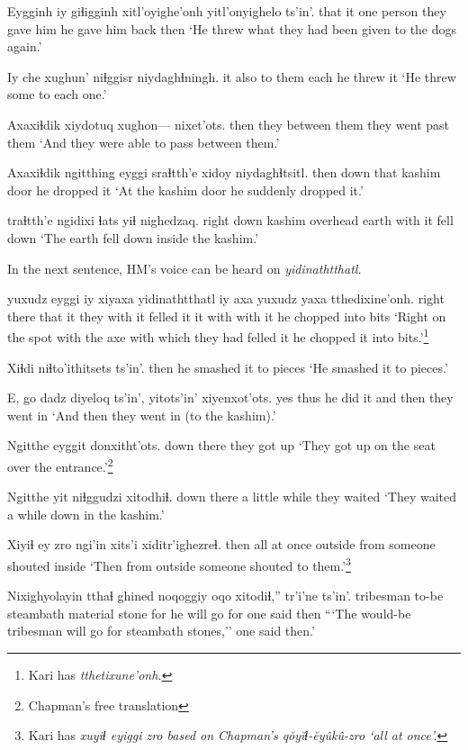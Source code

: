 \documentclass[12pt]{article}
\begin{document}
\gll Eygginh iy giɬigginh xitl'oyighe'onh yitl'onyighelo  ts'in'.
that it {one person} {they gave him} {he gave him back} then
\glt `He threw what they had been given to the dogs again.'
\glend

\gll Iy che xughun' niɬggisr niydaghɬningh.
it also {to them} each {he threw it}
\glt `He threw some to each one.'
\glend

\gll Axaxiɬdik xiydotuq  {xughon--- nixet'ots.}
then  {they between them} {they went past them}
\glt `And they were able to pass between them.'
\glend

\gll Axaxiɬdik ngitthing eyggi sraɬtth'e xidoy niydaghɬtsitl.
then  down  that  kashim  door  {he dropped it}
\glt `At the kashim door he suddenly dropped it.'
\glend

 traɬtth'e ngidixi ɬats yiɬ nighedzaq.
{right  down}  kashim  overhead earth with {it fell down}
\glt `The earth fell down inside the kashim.'
\glend

In the next sentence, HM's voice can be heard on \em yidinathtthatl. \em

 yuxudz eyggi  iy xiyaxa yidinathtthatl iy axa yuxudz yaxa  tthedixine'onh.
{right there} {} that  it {they with it} {felled it} it with {} {with it} {he chopped into bits}
\glt `Right on the spot with the axe with which they had felled it he chopped it into bits.'\footnote{Kari has \em tthetixune'onh.}
\glend

\gll Xiɬdi niɬto'ithitsets  ts'in'.
then {he smashed it to pieces} 
\glt `He smashed it to pieces.'
\glend

\gll E, {go dadz} diyeloq ts'in', yitots'in' xiyenxot'ots.
yes thus  {he did it} and then {they went in}
\glt `And then they went in (to the kashim).'
\glend

\gll Ngitthe eyggit donxitht'ots.
down  there  {they got up}
\glt `They got up on the seat over the entrance.'\footnote{Chapman's free translation}
\glend

\gll Ngitthe yit niɬggudzi xitodhiɬ.
down  there {a little while} {they waited}
\glt `They waited a while down in the kashim.'
\glend

\gll Xiyiɬ {ey zro} ngi'in  xits'i xiditr'ighezreɬ.
then {all at once} outside  from {someone shouted inside}
\glt `Then from outside someone shouted to them.'\footnote{Kari has \em xuyiɬ eyiggi zro \em based on Chapman's \em q\u{o}y\u{i}ɬ-\u{e}y\^uk\^u-zro \em `all at once'.}
\glend

\gll Nixighyolayin tthaɬ ghined noqoggiy oqo xitodiɬ,'' tr'i'ne ts'in'.
{tribesman to-be} steambath material stone  for {he will go for} {one said} then
\glt ```The would-be tribesman will go for steambath stones,'' one said then.'
\glend
\end{document}

